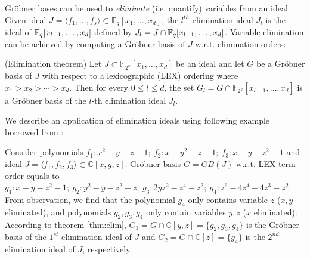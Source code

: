 Gr\"obner bases can be used to {\it eliminate} (i.e. quantify) variables from an
ideal. Given ideal $J = \langle f_1,\dots,f_s\rangle \subset \mathbb
F_{q}[x_1,\dots,x_d]$, the $l^{th}$ elimination ideal $J_l$ is the
ideal of ${\mathbb{F}}_{q}[x_{l+1}, \dots, x_d]$ defined by $J_l = J \cap
{\mathbb{F}}_{q}[x_{l+1}, \dots, x_d]$. Variable elimination can be achieved 
by computing a Gr\"obner basis of $J$ w.r.t. elimination orders: 
\begin{theorem}
\label{thm:elim}
(Elimination theorem\cite{ideals:book}) Let $J\subset \mathbb
  F_{2^k}[x_1,\dots,x_d]$ be an ideal and let $G$ be a Gr\"obner basis
  of $J$ with respect to a lexicographic (LEX) ordering where
  $x_1>x_2>\cdots>x_d$. Then for every $0\leq l\leq d$, the set $G_l =
  G\cap\mathbb F_{2^k}[x_{l+1},\dots,x_d]$ is a Gr\"obner basis of
  the $l$-th elimination ideal $J_l$.
\end{theorem}
We describe an application of elimination ideals using following example borrowed from \cite{ideals:book}:
\begin{example}
Consider polynomials $f_1: x^2-y-z-1;\ f_2:x-y^2-z-1;\ f_3:x-y-z^2-1$ and ideal $J = \langle f_1,f_2,f_3\rangle
\subset \mathbb C[x,y,z]$. Gr\"obner basis $G = GB(J)$ w.r.t. LEX term order equals to 
$g_1:x-y-z^2-1;\ g_2:y^2-y-z^2-z;\ g_3: 2yz^2-z^4-z^2;\ g_4:z^6-4z^4-4z^3-z^2$. From observation,
we find that the polynomial $g_4$ only contains variable $z$ ($x,y$ eliminated), and polynomials $g_2,g_3,g_4$ only contain variables
$y,z$ ($x$ eliminated). According to theorem \ref{thm:elim}, $G_1 = G\cap\mathbb C[y,z] = \{g_2,g_3,g_4\}$
is the Gr\"obner basis of the $1^{st}$ elimination ideal of $J$ and $G_2 = G\cap\mathbb C[z] = \{g_4\}$ is the 
$2^{nd}$ elimination ideal of $J$, respectively.
\end{example}

